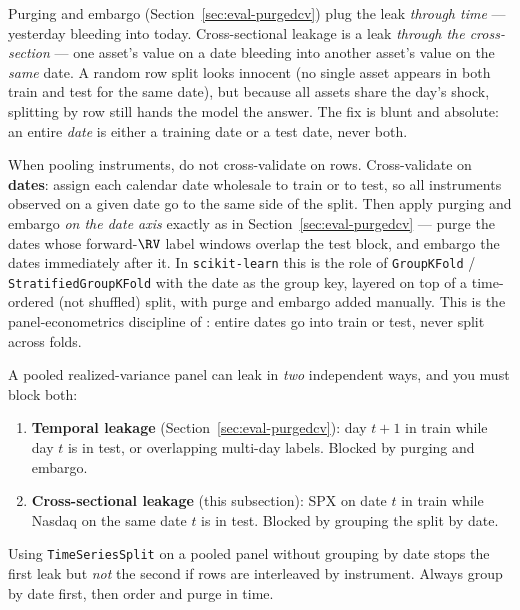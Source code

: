 \begin{intuition}
Purging and embargo (Section~\ref{sec:eval-purgedcv}) plug the leak \emph{through time} --- yesterday bleeding into today.
Cross-sectional leakage is a leak \emph{through the cross-section} --- one asset's value on a date bleeding into another asset's value on the \emph{same} date.
A random row split looks innocent (no single asset appears in both train and test for the same date), but because all assets share the day's shock, splitting by row still hands the model the answer.
The fix is blunt and absolute: an entire \emph{date} is either a training date or a test date, never both.
\end{intuition}

\begin{keyidea}
When pooling instruments, do not cross-validate on rows.
Cross-validate on \textbf{dates}: assign each calendar date wholesale to train or to test, so all instruments observed on a given date go to the same side of the split.
Then apply purging and embargo \emph{on the date axis} exactly as in Section~\ref{sec:eval-purgedcv} --- purge the dates whose forward-$\RV$ label windows overlap the test block, and embargo the dates immediately after it.
In \texttt{scikit-learn} this is the role of \texttt{GroupKFold} / \texttt{StratifiedGroupKFold} with the date as the group key, layered on top of a time-ordered (not shuffled) split, with purge and embargo added manually.
This is the panel-econometrics discipline of \citet{LopezdePrado2018}: entire dates go into train or test, never split across folds.
\end{keyidea}

\begin{warning}
A pooled realized-variance panel can leak in \emph{two} independent ways, and you must block both:
\begin{enumerate}[nosep]
  \item \textbf{Temporal leakage} (Section~\ref{sec:eval-purgedcv}): day $t{+}1$ in train while day $t$ is in test, or overlapping multi-day labels. Blocked by purging and embargo.
  \item \textbf{Cross-sectional leakage} (this subsection): SPX on date $t$ in train while Nasdaq on the same date $t$ is in test. Blocked by grouping the split by date.
\end{enumerate}
Using \texttt{TimeSeriesSplit} on a pooled panel without grouping by date stops the first leak but \emph{not} the second if rows are interleaved by instrument. Always group by date first, then order and purge in time.
\end{warning}

